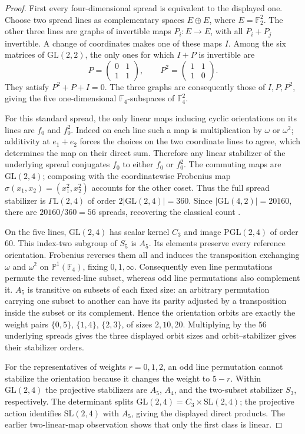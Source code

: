 \documentclass[11pt]{article}
\begin{document}
\begin{proof}
First every four-dimensional spread is equivalent to the displayed one.
Choose two spread lines as complementary spaces $E\oplus E$, where
$E=\mathbb F_2^2$. The other three lines are graphs of invertible maps
$P_i:E\to E$, with all $P_i+P_j$ invertible. A change of coordinates makes
one of these maps $I$. Among the six matrices of $\mathrm{GL}(2,2)$, the only
ones for which $I+P$ is invertible are
\[
P=\begin{pmatrix}0&1\\1&1\end{pmatrix},\qquad
P^2=\begin{pmatrix}1&1\\1&0\end{pmatrix}.
\]
They satisfy $P^2+P+I=0$. The three graphs are consequently those of
$I,P,P^2$, giving the five one-dimensional $\mathbb F_4$-subspaces of
$\mathbb F_4^2$.

For this standard spread, the only linear maps inducing cyclic orientations
on its lines are $f_0$ and $f_0^2$. Indeed on each line such a map is
multiplication by $\omega$ or $\omega^2$; additivity at $e_1+e_2$ forces
the choices on the two coordinate lines to agree, which determines the
map on their direct sum. Therefore any linear stabilizer of the underlying
spread conjugates $f_0$ to either $f_0$ or $f_0^2$.
The commuting maps are $\mathrm{GL}(2,4)$; composing with the coordinatewise
Frobenius map $\sigma(x_1,x_2)=(x_1^2,x_2^2)$ accounts for the other coset.
Thus the full spread stabilizer is $\Gamma\mathrm L(2,4)$ of order
$2|\mathrm{GL}(2,4)|=360$. Since $|\mathrm{GL}(4,2)|=20160$, there are
$20160/360=56$ spreads, recovering the classical count \cite{Mag22}.

On the five lines, $\mathrm{GL}(2,4)$ has scalar kernel $C_3$ and image
$\mathrm{PGL}(2,4)$ of order $60$. This index-two subgroup of $S_5$ is $A_5$.
Its elements preserve every reference orientation. Frobenius reverses them
all and induces the transposition exchanging $\omega$ and $\omega^2$ on
$\mathbb P^1(\mathbb F_4)$, fixing $0,1,\infty$.
Consequently even line permutations permute the reversed-line subset,
whereas odd line permutations also complement it.
$A_5$ is transitive on subsets of each fixed size: an arbitrary permutation
carrying one subset to another can have its parity adjusted by a transposition
inside the subset or its complement. Hence the orientation orbits are
exactly the weight pairs $\{0,5\}$, $\{1,4\}$, $\{2,3\}$, of sizes
$2,10,20$. Multiplying by the $56$ underlying spreads gives the three
displayed orbit sizes and orbit--stabilizer gives their stabilizer orders.

For the representatives of weights $r=0,1,2$, an odd line permutation
cannot stabilize the orientation because it changes the weight to $5-r$.
Within $\mathrm{GL}(2,4)$ the projective stabilizers are $A_5$, $A_4$,
and the two-subset stabilizer $S_3$, respectively.
The determinant splits $\mathrm{GL}(2,4)=C_3\times\mathrm{SL}(2,4)$;
the projective action identifies $\mathrm{SL}(2,4)$ with $A_5$, giving
the displayed direct products. The earlier two-linear-map observation
shows that only the first class is linear.
\end{proof}
\end{document}
